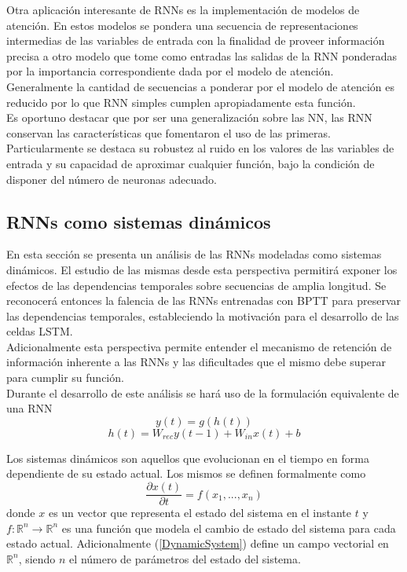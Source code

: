 \documentclass{article}
\begin{document}
	Otra aplicación interesante de RNNs es la implementación de modelos de atención. En estos modelos se pondera una secuencia de representaciones intermedias de las variables de entrada con la finalidad de proveer información precisa a otro modelo que tome como entradas las salidas de la RNN ponderadas por la importancia correspondiente dada por el modelo de atención.\\
	Generalmente la cantidad de secuencias a ponderar por el modelo de atención es reducido por lo que RNN simples cumplen apropiadamente esta función\cite{8AttentionModels, 65WordEmbeddingTextSumarizationPointingBack, 64WordEmbeddingTextSumarization}.\\
	
	Es oportuno destacar que por ser una generalización sobre las NN, las RNN conservan las características que fomentaron el uso de las primeras. Particularmente se destaca su robustez al ruido en los valores de las variables de entrada y su capacidad de aproximar cualquier función, bajo la condición de disponer del número de neuronas adecuado\cite{68UniversalApproximators}.\\
	
	
	\subsection{RNNs como sistemas dinámicos}
	En esta sección se presenta un análisis de las RNNs modeladas como sistemas dinámicos. El estudio de las mismas desde esta perspectiva permitirá exponer los efectos de las dependencias temporales sobre secuencias de amplia longitud. Se reconocerá entonces la falencia de las RNNs entrenadas con BPTT para preservar las dependencias temporales, estableciendo la motivación para el desarrollo de las celdas LSTM.\\
	Adicionalmente esta perspectiva permite entender el mecanismo de retención de información inherente a las RNNs y las dificultades que el mismo debe superar para cumplir su función.\\
	Durante el desarrollo de este análisis se hará uso de la formulación equivalente de una RNN\cite{10Pascanu}
	\begin{equation*}
	y(t) = g(h(t))
	\end{equation*}
	\begin{equation}\label{ReparametrizacionRNN}
	h(t) = W_{rec} y(t-1) + W_{in} x(t) + b
	\end{equation}
	
	Los sistemas dinámicos son aquellos que evolucionan en el tiempo en forma dependiente de su estado actual. Los mismos se definen formalmente como\cite{21StrogatzBook}\\
	\begin{equation}\label{DynamicSystem}
	\dfrac{\partial x(t)}{\partial t} = f(x_1, ... , x_n)
	\end{equation}
	donde $x$ es un vector que representa el estado del sistema en el instante $t$ y $f : \mathbb{R}^{n} \rightarrow \mathbb{R}^{n}$ es una función que modela el cambio de estado del sistema para cada estado actual. Adicionalmente (\ref{DynamicSystem}) define un campo vectorial en $\mathbb{R}^{n}$, siendo $n$ el número de parámetros del estado del sistema.\\
	
\end{document}
